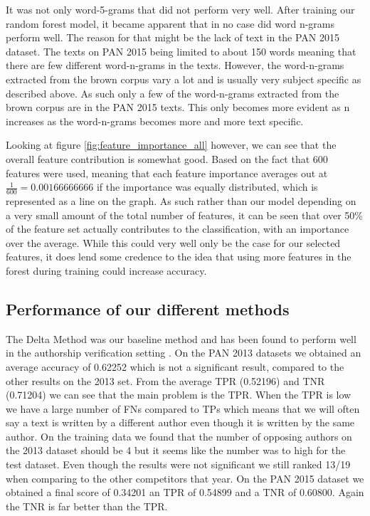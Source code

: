 It was not only word-5-grams that did not perform very well. After training our
random forest model, it became apparent that in no case did word n-grams perform
well. The reason for that might be the lack of text in the PAN 2015 dataset. The
texts on PAN 2015 being limited to about 150 words meaning that there are few
different word-n-grams in the texts. However, the word-n-grams extracted from
the brown corpus vary a lot and is usually very subject specific as described
above. As such only a few of the word-n-grams extracted from the brown corpus
are in the PAN 2015 texts. This only becomes more evident as n increases as the
word-n-grams becomes more and more text specific.

Looking at figure \ref{fig:feature_importance_all} however, we can see that
the overall feature contribution is somewhat good. Based on the fact that
600 features were used, meaning that each feature importance averages out at
$\frac{1}{600} = 0.00166666666$ if the importance was equally distributed, which
is represented as a line on the graph. As such rather than our model depending
on a very small amount of the total number of features, it can be seen that
over 50\% of the feature set actually contributes to the classification, with
an importance over the average. While this could very well only be the case for
our selected features, it does lend some credence to the idea that using more
features in the forest during training could increase accuracy.

\subsection{Performance of our different methods}

The Delta Method was our baseline method and has been found to perform well in
the authorship verification setting \cite{evert2015towards}. On the PAN 2013
datasets we obtained an average accuracy of 0.62252 which is not a significant
result, compared to the other results on the 2013 set. From the average
\gls{TPR} (0.52196) and \gls{TNR} (0.71204) we can see that the main problem is
the \gls{TPR}. When the \gls{TPR} is low we have a large number of \gls{FN}s
compared to \gls{TP}s which means that we will often say a text is written by a
different author even though it is written by the same author. On the training
data we found that the number of opposing authors on the 2013 dataset should be
4 but it seems like the number was to high for the test dataset. Even though the
results were not significant we still ranked 13/19 when comparing to the other
competitors that year. On the PAN 2015 dataset we obtained a final score of
0.34201 an \gls{TPR} of 0.54899 and a \gls{TNR} of 0.60800. Again the \gls{TNR}
is far better than the \gls{TPR}.


